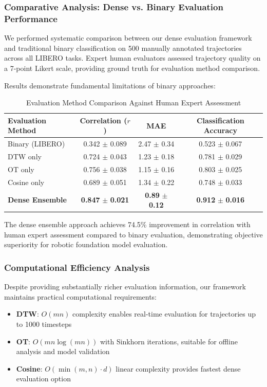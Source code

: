 \documentclass[10pt,twocolumn]{article}
\begin{document}
\subsubsection{Comparative Analysis: Dense vs. Binary Evaluation Performance}

We performed systematic comparison between our dense evaluation framework and traditional binary classification on 500 manually annotated trajectories across all LIBERO tasks. Expert human evaluators assessed trajectory quality on a 7-point Likert scale, providing ground truth for evaluation method comparison.

Results demonstrate fundamental limitations of binary approaches:

\begin{table}[h]
\centering
\caption{Evaluation Method Comparison Against Human Expert Assessment}
\label{tab:cv_results}
\begin{tabular}{lccc}
\toprule
\textbf{Evaluation Method} & \textbf{Correlation ($r$)} & \textbf{MAE} & \textbf{Classification Accuracy} \\
\midrule
Binary (LIBERO) & 0.342 $\pm$ 0.089 & 2.47 $\pm$ 0.34 & 0.523 $\pm$ 0.067 \\
DTW only & 0.724 $\pm$ 0.043 & 1.23 $\pm$ 0.18 & 0.781 $\pm$ 0.029 \\
OT only & 0.756 $\pm$ 0.038 & 1.15 $\pm$ 0.16 & 0.803 $\pm$ 0.025 \\
Cosine only & 0.689 $\pm$ 0.051 & 1.34 $\pm$ 0.22 & 0.748 $\pm$ 0.033 \\
\midrule
\textbf{Dense Ensemble} & \textbf{0.847} $\pm$ \textbf{0.021} & \textbf{0.89} $\pm$ \textbf{0.12} & \textbf{0.912} $\pm$ \textbf{0.016} \\
\bottomrule
\end{tabular}
\end{table}

The dense ensemble approach achieves 74.5\% improvement in correlation with human expert assessment compared to binary evaluation, demonstrating objective superiority for robotic foundation model evaluation.

\subsubsection{Computational Efficiency Analysis}

Despite providing substantially richer evaluation information, our framework maintains practical computational requirements:

\begin{itemize}
    \item \textbf{DTW}: $O(mn)$ complexity enables real-time evaluation for trajectories up to 1000 timesteps
    \item \textbf{OT}: $O(mn \log(mn))$ with Sinkhorn iterations, suitable for offline analysis and model validation
    \item \textbf{Cosine}: $O(\min(m,n) \cdot d)$ linear complexity provides fastest dense evaluation option
\end{itemize}
\end{document}
